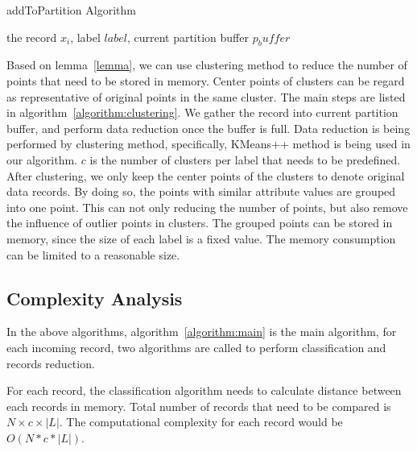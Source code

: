 \documentclass[runningheads]{llncs}
\begin{document}
	\begin{algorithm}
		\caption{addToPartition Algorithm} \label{algorithm:clustering}
		\begin{algorithmic}
			\REQUIRE the record $x_i$, label $label$, current partition buffer $p_buffer$
			\ELSE 
			\ENDFOR
			\ENDIF
		\end{algorithmic}
	\end{algorithm}
	
	Based on lemma~\ref{lemma}, we can use clustering method to reduce the number of points that need to be stored in memory. Center points of clusters can be regard as representative of original points in the same cluster. The main steps are listed in algorithm~\ref{algorithm:clustering}. We gather the record into current partition buffer, and perform data reduction once the buffer is full. Data reduction is being performed by clustering method, specifically, KMeans++\cite{Arthur} method is being used in our algorithm. $c$ is the number of clusters per label that needs to be predefined. After clustering, we only keep the center points of the clusters to denote original data records. By doing so, the points with similar attribute values are grouped into one point. This can not only reducing the number of points, but also remove the influence of outlier points in clusters. The grouped points can be stored in memory, since the size of each label is a fixed value. The memory consumption can be limited to a reasonable size. 
	
	\subsection{Complexity Analysis}
	
	In the above algorithms, algorithm~\ref{algorithm:main} is the main algorithm, for each incoming record, two algorithms are called to perform classification and records reduction.
	
	For each record, the classification algorithm needs to calculate distance between each records in memory. Total number of records that need to be compared is $N \times c \times |L|$. The computational complexity for each record would be $O(N*c*|L|)$.
	
\end{document}
